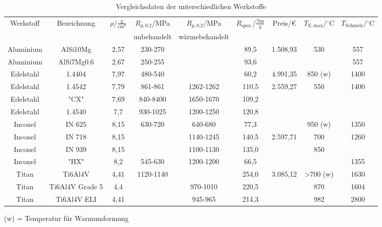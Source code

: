 \begin{landscape}
\begin{table}[h]
	\centering
	\begin{tabular}{|c|c|c|c|c|c|c|c|c|}
		\hline
		Werkstoff&Bezeichnung&$\rho$/$\frac{\mathrm{g}}{\mathrm{cm}^3}$&$R_{p,0.2}$/MPa&$R_{p,0.2}$/MPa&$R_\mathrm{spez.}$/$\frac{\mathrm{Nm}}{\mathrm{g}}$&Preis/€&$T_\mathrm{E, max}$/$^\circ$C&$T_\mathrm{Schmelz}$/$^\circ$C\\
		&&&unbehandelt&wärmebehandelt&&&&\\
		\hline \hline
		Aluminium&AlSi10Mg&2,57&230-270&&89,5&1.508,93&530&557\\
		Aluminium&AlSi7Mg0.6&2,67&250-255&&93,6&&&557\\
		\hline
		Edelstahl&1.4404&7,97&480-540&&60,2&4.991,35&850 (w)&1400\\
		Edelstahl&1.4542&7,79&861-861&1262-1262&110,5&2.559,27&550&1400\\
		Edelstahl&"CX"&7,69&840-8400&1650-1670&109,2&&&\\
		Edelstahl&1.4540&7,7&930-1025&1200-1250&120,8&&&\\
		\hline
		Inconel&IN 625&8,15&630-720&640-680&77,3&&950 (w)&1350\\
		Inconel&IN 718&8,15&&1140-1245&140,5&2.597,71&700&1260\\
		Inconel&IN 939&8,15&&1100-1130&135,0&&850&\\
		Inconel&"HX"&8,2&545-630&1200-1200&66,5&&&1355\\
		\hline
		Titan&Ti6Al4V&4,41&1120-1140&&254,0&3.085,12&>700 (w)&1630\\
		Titan&Ti6Al4V Grade 5&4,4&&970-1010&220,5&&870&1604\\
		Titan&Ti6Al4V ELI&4,41&&945-965&214,3&&982&2800\\
		\hline
	\end{tabular}
	\begin{flushright}
	\end{flushright}
	\caption{Vergleichsdaten der unterschiedlichen Werkstoffe}
	\label{tab_Werkstoffe} 
\end{table}
(w) = Temperatur für Warmumformung
\end{landscape}
